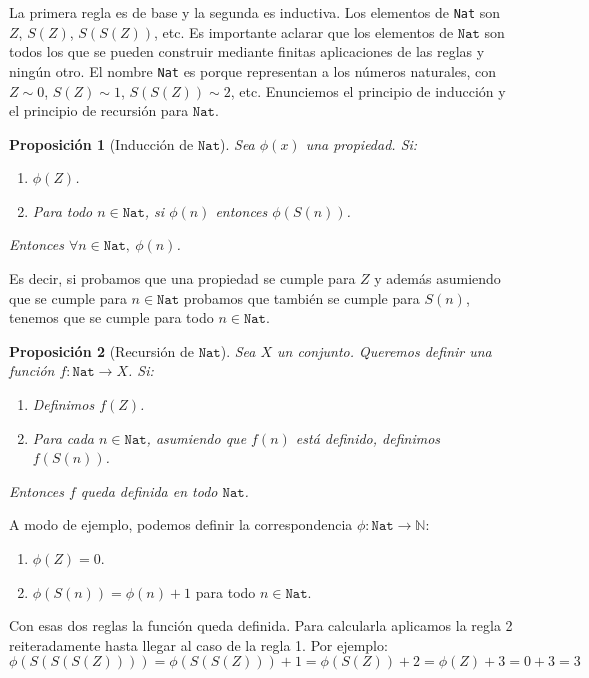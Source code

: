 \documentclass[a4paper, 12pt]{report}
\newcommand{\N}{\mathbb{N}}
\newtheorem*{prop*}{Proposición}
\theoremstyle{definition}
\begin{document}
La primera regla es de base y la segunda es inductiva. Los elementos de \texttt{Nat} son $Z$, $S(Z)$, $S(S(Z))$, etc. Es importante aclarar que los elementos de $\mathtt{Nat}$ son todos los que se pueden construir mediante finitas aplicaciones de las reglas y ningún otro. El nombre \texttt{Nat} es porque representan a los números naturales, con $Z\sim 0$, $S(Z)\sim 1$, $S(S(Z))\sim 2$, etc.
Enunciemos el principio de inducción y el principio de recursión para $\mathtt{Nat}$.
\begin{prop*}[Inducción de $\mathtt{Nat}$]
	
	Sea $\phi(x)$ una propiedad. Si:
	\begin{enumerate}
		\item $\phi(Z)$.
		\item Para todo $n\in\mathtt{Nat}$, si $\phi(n)$ entonces $\phi(S(n))$.
	\end{enumerate}
	Entonces $\forall n\in\mathtt{Nat},~\phi(n)$.
\end{prop*}
Es decir, si probamos que una propiedad se cumple para $Z$ y además asumiendo que se cumple para $n\in\mathtt{Nat}$ probamos que también se cumple para $S(n)$, tenemos que se cumple para todo $n\in\mathtt{Nat}$.

\begin{prop*}[Recursión de $\mathtt{Nat}$]
	Sea $X$ un conjunto. Queremos definir una función $f:\mathtt{Nat}\to X$. Si:
	\begin{enumerate}
		\item Definimos $f(Z)$.
		\item Para cada $n\in\mathtt{Nat}$, asumiendo que $f(n)$ está definido, definimos $f(S(n))$.
	\end{enumerate}
	Entonces $f$ queda definida en todo $\mathtt{Nat}$.
\end{prop*}
A modo de ejemplo, podemos definir la correspondencia $\phi:\mathtt{Nat}\to\N$:
\begin{enumerate}
	\item $\phi(Z) = 0$.
	\item $\phi(S(n)) = \phi(n) + 1$ para todo $n\in\mathtt{Nat}$.
\end{enumerate}
Con esas dos reglas la función queda definida. Para calcularla aplicamos la regla 2 reiteradamente hasta llegar al caso de la regla 1. Por ejemplo:
$$ \phi(S(S(S(Z)))) = \phi(S(S(Z))) + 1 = \phi(S(Z)) + 2 =
\phi(Z) + 3 = 0 + 3 = 3
$$
\end{document}
